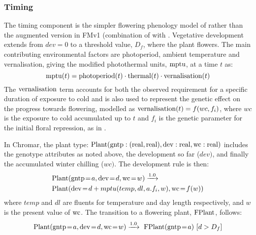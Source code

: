 \subsubsection*{Timing}
\label{timing}

The timing component is the simpler flowering phenology model of
\citet{wilczek_effects_2009} rather than the augmented version in FMv1
(combination of \citet{chew_augmented_2012} with
\citet{salazar_prediction_2009}. Vegetative development extends from \(dev = 0\)
to a threshold value, \(D_{f}\), where the plant flowers. The main contributing
environmental factors are photoperiod, ambient temperature and vernalisation,
giving the modified photothermal units, \(\mathrm{mptu}\), at a time \(t\) as:
\[\mathrm{mptu}(t) = \mathrm{photoperiod}(t) \cdot \mathrm{thermal}(t) \cdot \mathrm{vernalisation}(t)\]
The \(\mathrm{vernalisation}\) term accounts for both the observed requirement for
a specific duration of exposure to cold and is also used to represent the
genetic effect on the progress towards flowering, modelled as
\(\mathrm{vernalisation}(t) = f(wc,f_{i})\), where $wc$ is the exposure to
cold accumulated up to \(t\) and \(f_{i}\) is the genetic parameter for the
initial floral repression, as in \citet{wilczek_effects_2009}.

In Chromar, the plant type:
\(\mathrm{Plant}(\mathrm{gntp}:(\mathrm{real},\mathrm{real}),\mathrm{dev}:\mathrm{real},\mathrm{wc}:\mathrm{real})\)
includes the genotype attributes as noted above, the development so far
(\(dev)\), and finally the accumulated winter chilling (\(wc)\). The
development rule is then:
\begin{equation*}
\begin{split}
&\mr{Plant}(\ar{gntp}{a},\ar{dev}{d}, \ar{wc}{w}) \xrightarrow{1.0} \\ 
&\mr{Plant}(\ar{dev}{d + mptu( temp, dl, a.f_{i}, w )},\ar{wc}{f(w)})
\end{split}
\end{equation*}
where $temp$ and $dl$ are fluents for temperature and day
length respectively, and $w$ is the present value of $\mathrm{wc}$. The transition to a
flowering plant, \(\mathrm{FPlant}\), follows:
$$
\mr{Plant}(\ar{gntp}{a}, \ar{dev}{d}, \ar{wc}{w}) \xrightarrow{1.0} \mr{\ FPlant}(\ar{gntp}{a}) \, \, \lbrack d > D_{f} \rbrack
$$

